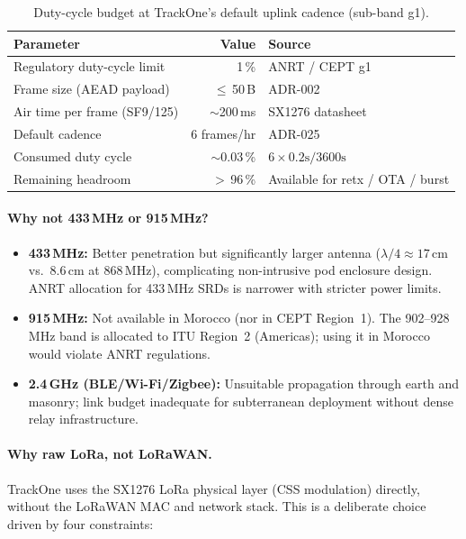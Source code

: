 \begin{table}[H]
\centering
\small
\caption{Duty-cycle budget at TrackOne's default uplink cadence (sub-band g1).}
\label{tab:duty-cycle-budget}
\begin{tabular}{@{}lrl@{}}
\toprule
\textbf{Parameter}            & \textbf{Value}       & \textbf{Source} \\
\midrule
Regulatory duty-cycle limit   & 1\,\%          & \ac{ANRT} / CEPT g1                   \\
Frame size (\ac{AEAD} payload)     & $\le$\,50\,B         & \ac{ADR}-002                          \\
Air time per frame (\ac{SF}9/125)  & $\sim$200\,ms        & SX1276 datasheet \\
Default cadence               & 6 frames/hr          & \ac{ADR}-025                          \\
Consumed duty cycle           & $\sim$0.03\,\%       & $6 \times 0.2\text{s} / 3600\text{s}$ \\
Remaining headroom            & $>$\,96\,\%          & Available for retx / OTA / burst \\
\bottomrule
\end{tabular}
\end{table}

\paragraph{Why not 433\,MHz or 915\,MHz?}
\begin{itemize}[nosep]
    \item \textbf{433\,MHz:} Better penetration but significantly larger antenna
          ($\lambda/4 \approx 17$\,cm vs.\ 8.6\,cm at 868\,MHz), complicating
    non-intrusive pod enclosure design.
    \ac{ANRT} allocation for 433\,MHz \ac{SRD}s
    is narrower with stricter power limits.
    \item \textbf{915\,MHz:} Not available in Morocco (nor in CEPT Region~1).
          The 902--928\, MHz band is allocated to ITU Region~2 (Americas);
    using it in Morocco would violate \ac{ANRT} regulations.
    \item \textbf{2.4\,GHz (BLE/Wi-Fi/Zigbee):} Unsuitable propagation through
    earth and masonry; link budget inadequate for subterranean deployment
    without dense relay infrastructure.
\end{itemize}

\paragraph{Why raw LoRa, not LoRaWAN.}
TrackOne uses the SX1276 \ac{LoRa} physical layer (CSS modulation) directly,
without the \ac{LoRa}WAN MAC and network stack.
This is a deliberate choice
driven by four constraints:

